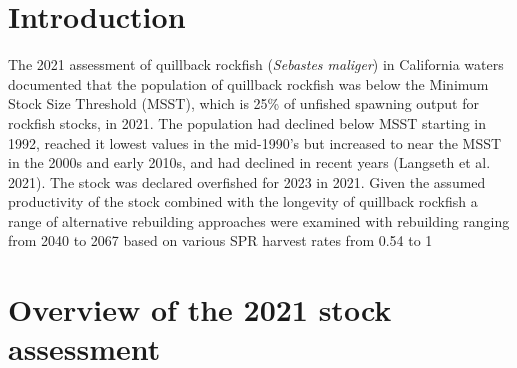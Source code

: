 \documentclass[11pt,
  english,
  a4paper,
]{article}
\begin{document}
\leavevmode\tagmcend\tagstructend\par

\pagebreak
\setlength{\parskip}{5mm plus1mm minus1mm}
\setcounter{page}{1}
\renewcommand{\thefigure}{\arabic{figure}}
\renewcommand{\thetable}{\arabic{table}}
\setcounter{table}{0}
\setcounter{figure}{0}

\setlength\parskip{0.2em plus 0.1em minus 0.2em}


\hypertarget{introduction}{%
\section{Introduction}\label{introduction}}

\leavevmode\tagmcend\tagstructend


The 2021 assessment of quillback rockfish (\emph{Sebastes maliger}) in California waters documented that the population of quillback rockfish was below the Minimum Stock Size Threshold (MSST), which is 25\% of unfished spawning output for rockfish stocks, in 2021. The population had declined below MSST starting in 1992, reached it lowest values in the mid-1990's but increased to near the MSST in the 2000s and early 2010s, and had declined in recent years {(Langseth et al. 2021)\leavevmode\tagmcend\tagstructend}. The stock was declared overfished for 2023 in 2021. Given the assumed productivity of the stock combined with the longevity of quillback rockfish a range of alternative rebuilding approaches were examined with rebuilding ranging from 2040 to 2067 based on various SPR harvest rates from 0.54 to 1

\leavevmode\tagmcend\tagstructend\par


\hypertarget{overview-of-the-2021-stock-assessment}{%
\section{Overview of the 2021 stock assessment}\label{overview-of-the-2021-stock-assessment}}

\leavevmode\tagmcend\tagstructend

\end{document}
